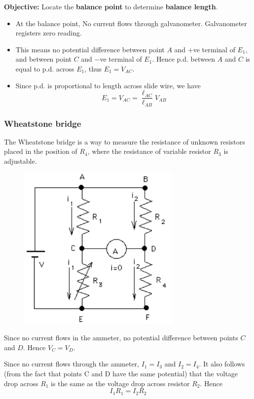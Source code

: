 \textbf{Objective:} Locate the \textbf{balance point} to determine \textbf{balance length}.
\begin{itemize}
\item At the balance point, No current flows through galvanometer. Galvanometer registers zero reading.
\item This means no potential difference between point $A$ and $+$ve terminal of $E_1$, and between point $C$ and $-$ve terminal of $E_1$. Hence p.d. between $A$ and $C$ is equal to p.d. across $E_1$, thus $E_1=V_{AC}$.
\item Since p.d. is proportional to length across slide wire, we have 
\[ E_1 = V_{AC} = \frac{\ell_{AC}}{\ell_{AB}}V_{AB} \]
\end{itemize}

\subsubsection{Wheatstone bridge}
The Wheatstone bridge is a way to measure the resistance of unknown resistors placed in the position of $R_4$, where the resistance of variable resistor $R_3$ is adjustable.

\begin{figure}[H]
    \centering
    \includegraphics[width=8cm]{images/wheatstone.png}
\end{figure}

Since no current flows in the ammeter, no potential difference between points $C$ and $D$. Hence $V_C=V_D$.

Since no current flows through the ammeter, $I_1=I_3$ and $I_2=I_4$. It also follows (from the fact that points C and D have the same potential) that the voltage drop across $R_1$ is the same as the voltage drop across resistor $R_2$. Hence
\begin{equation*}\tag{1}
I_1 R_1 = I_2 R_2
\end{equation*}

